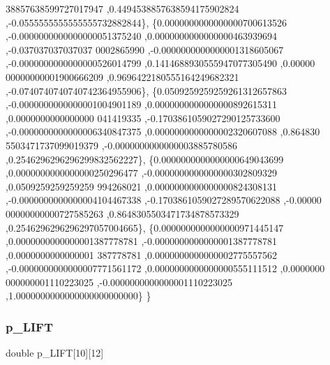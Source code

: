 \begin{DoxyCode}
      38857638599727017947 ,0.4494538857638594175902824 ,-0.0555555555555555732882844\},
\{0.0000000000000000700613526 ,-0.0000000000000000051375240 ,0.0000000000000000463939694 ,-0.037037037037037
      0002865990 ,-0.0000000000000001318605067 ,-0.0000000000000000526014799 ,0.1414688930555947077305490 ,0.00000
      00000000001900666209 ,0.9696422180555164249682321 ,-0.0740740740740742364955906\},
\{0.0509259259259261312657863 ,-0.0000000000000001004901189 ,0.0000000000000000892615311 ,0.0000000000000000
      041419335 ,-0.1703861059027290125733600 ,-0.0000000000000006340847375 ,0.0000000000000002320607088 ,0.864830
      5503471737099019379 ,-0.0000000000000003885780586 ,0.2546296296296299832562227\},
\{0.0000000000000000649043699 ,0.0000000000000000250296477 ,-0.0000000000000000302809329 ,0.0509259259259259
      994268021 ,0.0000000000000000824308131 ,-0.0000000000000004104467338 ,-0.1703861059027289570622088 ,-0.00000
      00000000000727585263 ,0.8648305503471734878573329 ,0.2546296296296297057004665\},
\{0.0000000000000000971445147 ,0.0000000000000001387778781 ,-0.0000000000000001387778781 ,0.0000000000000001
      387778781 ,0.0000000000000002775557562 ,-0.0000000000000007771561172 ,0.0000000000000000555111512 ,0.0000000
      000000001110223025 ,-0.0000000000000001110223025 ,1.0000000000000000000000000\}
\}
\end{DoxyCode}
\mbox{\label{a00452_aefff047c0c87461150b141f54f837e81}} 
\subsubsection{\texorpdfstring{p\+\_\+\+L\+I\+FT}{p\_LIFT}}
{\footnotesize\ttfamily double p\+\_\+\+L\+I\+FT\mbox{[}10\mbox{]}\mbox{[}12\mbox{]}}

